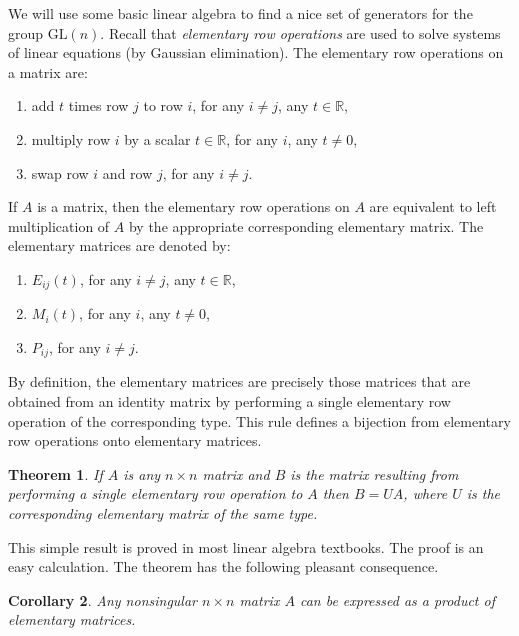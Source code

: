 \documentclass[11pt]{article}
\newtheorem{thm}{Theorem}[section]
\newtheorem{cor}[thm]{Corollary}
\theoremstyle{definition}
\newcommand{\R}{\mathbb{R}} %
\newcommand{\GL}{\mathrm{GL}}
\begin{document}
We will use some basic linear algebra to find a nice set of generators
for the group $\GL(n)$. Recall that \emph{elementary row operations}
are used to solve systems of linear equations (by Gaussian
elimination). The elementary row operations on a matrix are:
\begin{enumerate}[label=(\roman*),leftmargin=1in]
 \item add $t$ times row $j$ to row $i$, for any $i \ne j$, any $t \in \R$,
 \item multiply row $i$ by a scalar $t \in \R$, for any $i$, any $t \ne 0$, 
 \item swap row $i$ and row $j$, for any $i \ne j$.
\end{enumerate}
If $A$ is a matrix, then the elementary row operations on $A$ are
equivalent to  left multiplication of $A$ by the appropriate
corresponding elementary matrix. The elementary matrices are denoted
by:
\begin{enumerate}[label=(\roman*),leftmargin=1in]
 \item $E_{ij}(t)$, for any $i \ne j$, any $t \in \R$,
 \item $M_{i}(t)$, for any $i$, any $t \ne 0$, 
 \item $P_{ij}$, for any $i \ne j$.
\end{enumerate}
By definition, the elementary matrices are
precisely those matrices that are obtained from an identity matrix by
performing a single elementary row operation of the corresponding
type. This rule defines a bijection from elementary row operations
onto elementary matrices.

\begin{thm}
  If $A$ is any $n \times n$ matrix and $B$ is the matrix resulting
  from performing a single elementary row operation to $A$ then $B =
  UA$, where $U$ is the corresponding elementary matrix of the same
  type.
\end{thm}

This simple result is proved in most linear algebra textbooks. The
proof is an easy calculation. The theorem has the following pleasant
consequence.

\begin{cor}
  Any nonsingular $n \times n$ matrix $A$ can be expressed as a product
  of elementary matrices.
\end{cor}
\end{document}
